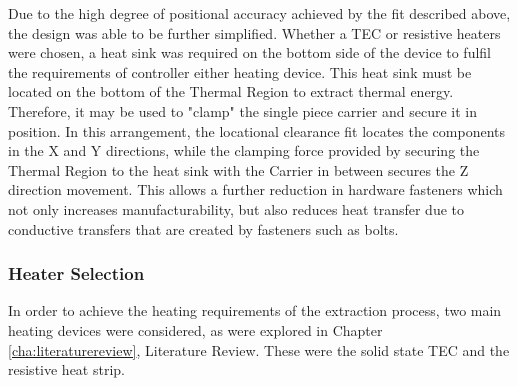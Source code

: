 Due to the high degree of positional accuracy achieved by the fit described above, the design was able to be further simplified. Whether a TEC or resistive heaters were chosen, a heat sink was required on the bottom side of the device to fulfil the requirements of controller either heating device. This heat sink must be located on the bottom of the Thermal Region to extract thermal energy. Therefore, it may be used to "clamp" the single piece carrier and secure it in position. In this arrangement, the locational clearance fit locates the components in the X and Y directions, while the clamping force provided by securing the Thermal Region to the heat sink with the Carrier in between secures the Z direction movement. This allows a further reduction in hardware fasteners which not only increases manufacturability, but also reduces heat transfer due to conductive transfers that are created by fasteners such as bolts.

\subsubsection{Heater Selection}

In order to achieve the heating requirements of the extraction process, two main heating devices were considered, as were explored in Chapter \ref{cha:literaturereview}, Literature Review. These were the solid state TEC and the resistive heat strip.\\

